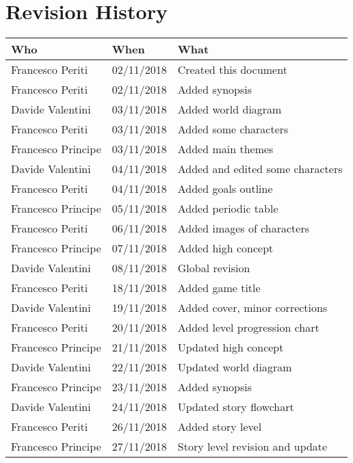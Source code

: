 \chapter*{Revision History}

\begin{table}[H]
\centering
\begin{tabular}{|l|l|l|}
\hline
\cellcolor{lightgray}\textbf{Who} & \cellcolor{lightgray}\textbf{When} & \cellcolor{lightgray}\textbf{What} \\ \hline
Francesco Periti & 02/11/2018 & Created this document \\ \hline
Francesco Periti & 02/11/2018 & Added synopsis \\ \hline
Davide Valentini & 03/11/2018 & Added world diagram \\ \hline
Francesco Periti & 03/11/2018 & Added some characters \\ \hline
Francesco Principe & 03/11/2018 & Added main themes \\ \hline
Davide Valentini & 04/11/2018 & Added and edited some characters \\ \hline
Francesco Periti & 04/11/2018 & Added goals outline \\ \hline
Francesco Principe & 05/11/2018 & Added periodic table \\ \hline
Francesco Periti & 06/11/2018 & Added images of characters \\ \hline
Francesco Principe & 07/11/2018 & Added high concept \\ \hline
Davide Valentini & 08/11/2018 & Global revision \\ \hline
Francesco Periti & 18/11/2018 & Added game title \\ \hline
Davide Valentini & 19/11/2018 & Added cover, minor corrections \\ \hline
Francesco Periti & 20/11/2018 & Added level progression chart \\ \hline
Francesco Principe & 21/11/2018 & Updated high concept \\ \hline
Davide Valentini & 22/11/2018 & Updated world diagram \\ \hline
Francesco Principe & 23/11/2018 & Added synopsis \\ \hline
Davide Valentini & 24/11/2018 & Updated story flowchart \\ \hline
Francesco Periti & 26/11/2018 & Added story level \\ \hline
Francesco Principe & 27/11/2018 & Story level revision and update \\ \hline

\end{tabular}
\end{table}

